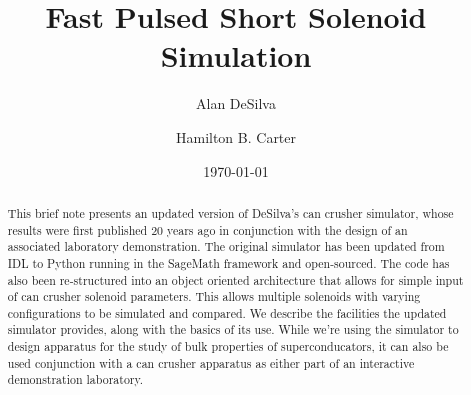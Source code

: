 \documentclass[prb,preprint]{revtex4-1}
\begin{document}

\title{Fast Pulsed Short Solenoid Simulation
}

\author{Alan DeSilva}

\author{Hamilton B. Carter}


\date{\today}

\begin{abstract}
This brief note  presents an updated version of DeSilva's can crusher simulator, whose results were first published 20 years ago in conjunction with the design of an associated laboratory demonstration.  The original simulator has been updated from IDL to Python running in the SageMath framework and open-sourced.  The code has also been re-structured into an object oriented architecture that allows for simple input of can crusher solenoid parameters.  This allows multiple solenoids with varying configurations to be simulated and compared.  We describe the facilities the updated simulator provides, along with the basics of its use.  While we're using the simulator to design apparatus for the study of bulk properties of superconducators, it can also be used conjunction with a can crusher apparatus as either part of an interactive demonstration laboratory.
\end{abstract}

\maketitle %
\end{document}
